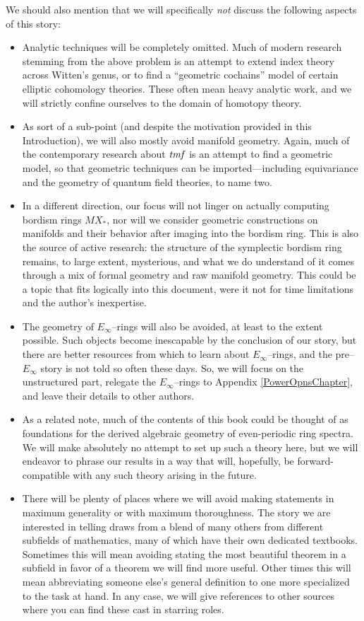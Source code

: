 We should also mention that we will specifically \emph{not} discuss the following aspects of this story:
\begin{itemize}
\item Analytic techniques will be completely omitted.  Much of modern research stemming from the above problem is an attempt to extend index theory across Witten's genus, or to find a ``geometric cochains'' model of certain elliptic cohomology theories.  These often mean heavy analytic work, and we will strictly confine ourselves to the domain of homotopy theory.
\item As sort of a sub-point (and despite the motivation provided in this Introduction), we will also mostly avoid manifold geometry.  Again, much of the contemporary research about \(\mathit{tmf}\) is an attempt to find a geometric model, so that geometric techniques can be imported---including equivariance and the geometry of quantum field theories, to name two.
\item In a different direction, our focus will not linger on actually computing bordism rings \(MX_*\), nor will we consider geometric constructions on manifolds and their behavior after imaging into the bordism ring.  This is also the source of active research: the structure of the symplectic bordism ring remains, to large extent, mysterious, and what we do understand of it comes through a mix of formal geometry and raw manifold geometry.  This could be a topic that fits logically into this document, were it not for time limitations and the author's inexpertise.
\item The geometry of \(E_\infty\)--rings will also be avoided, at least to the extent possible.  Such objects become inescapable by the conclusion of our story, but there are better resources from which to learn about \(E_\infty\)--rings, and the pre--\(E_\infty\) story is not told so often these days.  So, we will focus on the unstructured part, relegate the \(E_\infty\)--rings to Appendix \ref{PowerOpnsChapter}, and leave their details to other authors.
\item As a related note, much of the contents of this book could be thought of as foundations for the derived algebraic geometry of even-periodic ring spectra.  We will make absolutely no attempt to set up such a theory here, but we will endeavor to phrase our results in a way that will, hopefully, be forward-compatible with any such theory arising in the future.
\item There will be plenty of places where we will avoid making statements in maximum generality or with maximum thoroughness.  The story we are interested in telling draws from a blend of many others from different subfields of mathematics, many of which have their own dedicated textbooks.  Sometimes this will mean avoiding stating the most beautiful theorem in a subfield in favor of a theorem we will find more useful.  Other times this will mean abbreviating someone else's general definition to one more specialized to the task at hand.  In any case, we will give references to other sources where you can find these cast in starring roles.
\end{itemize}

